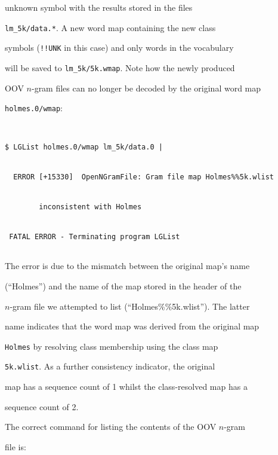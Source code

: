 unknown symbol with the results stored in the files


\texttt{lm\_5k/data.*}.  A new word map containing the new class


symbols (\texttt{!!UNK} in this case) and only words in the vocabulary


will be saved to \texttt{lm\_5k/5k.wmap}.  Note how the newly produced


OOV $n$-gram files can no longer be decoded by the original word map


\texttt{holmes.0/wmap}:


\begin{verbatim}


$ LGList holmes.0/wmap lm_5k/data.0 |


  ERROR [+15330]  OpenNGramFile: Gram file map Holmes%%5k.wlist 


        inconsistent with Holmes


 FATAL ERROR - Terminating program LGList


\end{verbatim} %


The error is due to the mismatch between the original map's name


(``Holmes'') and the name of the map stored in the header of the


$n$-gram file we attempted to list (``Holmes\%\%5k.wlist''). The latter


name indicates that the word map was derived from the original map


\texttt{Holmes} by resolving class membership using the class map


\texttt{5k.wlist}.  As a further consistency indicator, the original


map has a sequence count of 1 whilst the class-resolved map has a


sequence count of 2.





The correct command for listing the contents of the OOV $n$-gram


file is:


